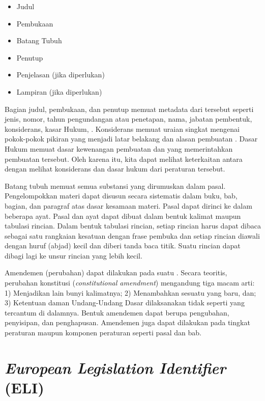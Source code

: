 \begin{itemize}
  \item Judul
  \item Pembukaan
  \item Batang Tubuh
  \item Penutup
  \item Penjelasan (jika diperlukan)
  \item Lampiran (jika diperlukan)
\end{itemize}

Bagian judul, pembukaan, dan penutup memuat metadata dari \legal tersebut seperti jenis, nomor,
tahun pengundangan atau penetapan, nama, jabatan pembentuk, konsiderans, kasar Hukum, \legal.
Konsiderans memuat uraian singkat mengenai pokok-pokok pikiran yang menjadi latar belakang dan
alasan pembuatan \legal. Dasar Hukum memuat dasar kewenangan pembuatan \legal dan \legal yang
memerintahkan pembuatan \legal tersebut. Oleh karena itu, kita dapat melihat keterkaitan antara
\legal dengan melihat konsiderans dan dasar hukum dari peraturan tersebut.

Batang tubuh \legal memuat semua substansi \legal yang dirumuskan dalam pasal. Pengelompokkan materi
\legal dapat disusun secara sistematis dalam buku, bab, bagian, dan paragraf atas dasar kesamaan
materi. Pasal dapat dirinci ke dalam beberapa ayat. Pasal dan ayat dapat dibuat dalam bentuk kalimat
maupun tabulasi rincian. Dalam bentuk tabulasi rincian, setiap rincian harus dapat dibaca sebagai
satu rangkaian kesatuan dengan frase pembuka dan setiap rincian diawali dengan huruf (abjad) kecil
dan diberi tanda baca titik. Suatu rincian dapat dibagi lagi ke unsur rincian yang lebih kecil.

Amendemen (perubahan) dapat dilakukan pada suatu \legal. Secara teoritis, perubahan konstitusi
(\textit{constitutional amendment}) mengandung tiga macam arti: 1) Menjadikan lain bunyi kalimatnya;
2) Menambahkan sesuatu yang baru, dan; 3) Ketentuan daman Undang-Undang Dasar dilaksanakan tidak
seperti yang tercantum di dalamnya\citep{teori_amandemen}. Bentuk amendemen dapat berupa pengubahan,
penyisipan, dan penghapusan. Amendemen juga dapat dilakukan pada tingkat peraturan maupun komponen
peraturan seperti pasal dan bab.

\section{\textit{European Legislation Identifier} (ELI)}
\label{sec:eli}

